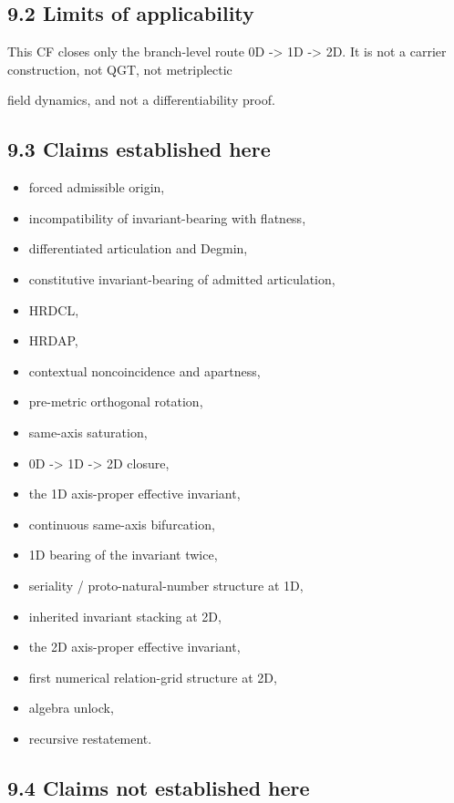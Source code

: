 \documentclass[11pt]{article}
\begin{document}
\subsection{9.2 Limits of applicability}\label{limits-of-applicability}

This CF closes only the branch-level route 0D -\textgreater{} 1D -\textgreater{} 2D. It is not a carrier construction, not QGT, not metriplectic

field dynamics, and not a differentiability proof.

\subsection{9.3 Claims established here}\label{claims-established-here}

\begin{itemize}
\item
  forced admissible origin,
\item
  incompatibility of invariant-bearing with flatness,
\item
  differentiated articulation and Degmin,
\item
  constitutive invariant-bearing of admitted articulation,
\item
  HRDCL,
\item
  HRDAP,
\item
  contextual noncoincidence and apartness,
\item
  pre-metric orthogonal rotation,
\item
  same-axis saturation,
\item
  0D -\textgreater{} 1D -\textgreater{} 2D closure,
\item
  the 1D axis-proper effective invariant,
\item
  continuous same-axis bifurcation,
\item
  1D bearing of the invariant twice,
\item
  seriality / proto-natural-number structure at 1D,
\item
  inherited invariant stacking at 2D,
\item
  the 2D axis-proper effective invariant,
\item
  first numerical relation-grid structure at 2D,
\item
  algebra unlock,
\item
  recursive restatement.
\end{itemize}

\subsection{9.4 Claims not established here}\label{claims-not-established-here}
\end{document}
